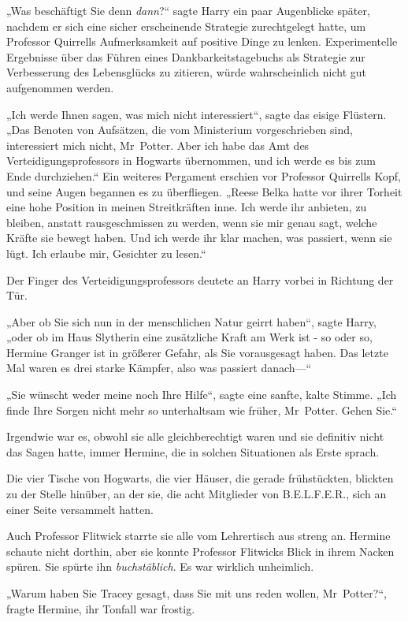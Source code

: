 {„Was beschäftigt Sie denn \emph{dann}?“ sagte Harry ein paar Augenblicke später, nachdem er sich eine sicher erscheinende Strategie zurechtgelegt hatte, um Professor Quirrells Aufmerksamkeit auf positive Dinge zu lenken. Experimentelle Ergebnisse über das Führen eines Dankbarkeitstagebuchs als Strategie zur Verbesserung des Lebensglücks zu zitieren, würde wahrscheinlich nicht gut aufgenommen werden.

„Ich werde Ihnen sagen, was mich nicht interessiert“, sagte das eisige Flüstern. „Das Benoten von Aufsätzen, die vom Ministerium vorgeschrieben sind, interessiert mich nicht, Mr~Potter. Aber ich habe das Amt des Verteidigungsprofessors in Hogwarts übernommen, und ich werde es bis zum Ende durchziehen.“ Ein weiteres Pergament erschien vor Professor Quirrells Kopf, und seine Augen begannen es zu überfliegen. „Reese Belka hatte vor ihrer Torheit eine hohe Position in meinen Streitkräften inne. Ich werde ihr anbieten, zu bleiben, anstatt rausgeschmissen zu werden, wenn sie mir genau sagt, welche Kräfte sie bewegt haben. Und ich werde ihr klar machen, was passiert, wenn sie lügt. Ich erlaube mir, Gesichter zu lesen.“

Der Finger des Verteidigungsprofessors deutete an Harry vorbei in Richtung der Tür.

„Aber ob Sie sich nun in der menschlichen Natur geirrt haben“, sagte Harry, „oder ob im Haus Slytherin eine zusätzliche Kraft am Werk ist - so oder so, Hermine Granger ist in größerer Gefahr, als Sie vorausgesagt haben. Das letzte Mal waren es drei starke Kämpfer, also was passiert danach—“

„Sie wünscht weder meine noch Ihre Hilfe“, sagte eine sanfte, kalte Stimme. „Ich finde Ihre Sorgen nicht mehr so unterhaltsam wie früher, Mr~Potter. Gehen Sie.“

Irgendwie war es, obwohl sie alle gleichberechtigt waren und sie definitiv nicht das Sagen hatte, immer Hermine, die in solchen Situationen als Erste sprach.

Die vier Tische von Hogwarts, die vier Häuser, die gerade frühstückten, blickten zu der Stelle hinüber, an der sie, die acht Mitglieder von B.E.L.F.E.R., sich an einer Seite versammelt hatten.

Auch Professor Flitwick starrte sie alle vom Lehrertisch aus streng an. Hermine schaute nicht dorthin, aber sie konnte Professor Flitwicks Blick in ihrem Nacken spüren. Sie spürte ihn \emph{buchstäblich}. Es war wirklich unheimlich.

„Warum haben Sie Tracey gesagt, dass Sie mit uns reden wollen, Mr~Potter?“, fragte Hermine, ihr Tonfall war frostig.

}
